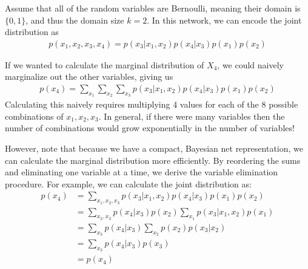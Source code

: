 \documentclass[12pt]{article}
\begin{document}
\begin{figure}[htp]
\begin{center}


\end{center}
\end{figure}

Assume that all of the random variables are Bernoulli, meaning their domain is $\{0, 1\}$, and thus the domain size $k = 2$. In this network, we can encode the joint distribution as
\begin{align} p(x_1, x_2, x_3, x_4) = p(x_3 | x_1, x_2)p(x_4 | x_3)p(x_1)p(x_2)\end{align}

If we wanted to calculate the marginal distribution of $X_4$, we could naively marginalize out the other variables, giving us
\begin{align}
p(x_4) = \sum_{x_1}\sum_{x_2}\sum_{x_3}p(x_3 | x_1, x_2)p(x_4 | x_3)p(x_1)p(x_2)
\end{align}
Calculating this naively requires multiplying 4 values for each of the 8 possible combinations of $x_1, x_2, x_3$.
In general, if there were many variables then the number of combinations would grow exponentially
in the number of variables!
%

However, note that because we have a compact, Bayesian net representation, 
we can  calculate the marginal distribution more efficiently. By reordering the sums and eliminating one variable at a time, we derive the variable elimination procedure. For example, we can calculate the joint distribution as:
\begin{align}
p(x_4) &= \sum_{x_1, x_2, x_3}p(x_3 | x_1, x_2)p(x_4 | x_3)p(x_1)p(x_2) \\
&= \sum_{x_2, x_3}p(x_4 | x_3)p(x_2)\sum_{x_1}p(x_3 | x_1, x_2)p(x_1) \\
&= \sum_{x_3}p(x_4 | x_3)\sum_{x_2}p(x_2)p(x_3 | x_2)\\
&= \sum_{x_3}p(x_4 | x_3)p(x_3)\\
&= p(x_4)
\end{align}
\end{document}
